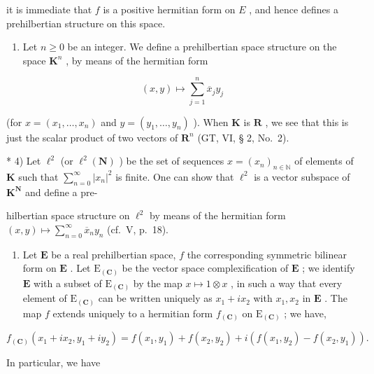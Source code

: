 it is immediate that \(f\) is a positive hermitian form on \(E\) , and hence defines a prehilbertian structure on this space.

\begin{enumerate}
\def\labelenumi{\arabic{enumi})}
\setcounter{enumi}{2}
\tightlist
\item
  Let \(n \geqslant 0\) be an integer. We define a prehilbertian space structure on the space \(\mathbf{K}^n\) , by means of the hermitian form
\end{enumerate}

\[
(x, y) \mapsto \sum_ {j = 1} ^ {n} \overline {{{{x}}}} _ {j} y _ {j}
\]

(for \(x = (x_{1}, \ldots, x_{n})\) and \(y = (y_{1}, \ldots, y_{n})\) ). When \(\mathbf{K}\) is \(\mathbf{R}\) , we see that this is just the scalar product of two vectors of \(\mathbf{R}^{n}\) (GT, VI, § 2, No.~2).

* 4) Let \(\ell^2\) (or \(\ell^2(\mathbf{N})\) ) be the set of sequences \(x = (x_n)_{n \in \mathbb{N}}\) of elements of \(\mathbf{K}\) such that \(\sum_{n=0}^{\infty} |x_n|^2\) is finite. One can show that \(\ell^2\) is a vector subspace of \(\mathbf{K}^{\mathbf{N}}\) and define a pre-

hilbertian space structure on \(\ell^2\) by means of the hermitian form \((x, y) \mapsto \sum_{n=0}^{\infty} \overline{x}_n y_n\) (cf.~V, p.~18).

\begin{enumerate}
\def\labelenumi{\arabic{enumi})}
\setcounter{enumi}{4}
\tightlist
\item
  Let \(\mathbf{E}\) be a real prehilbertian space, \(f\) the corresponding symmetric bilinear form on \(\mathbf{E}\) . Let \(\mathrm{E}_{(\mathbf{C})}\) be the vector space complexification of \(\mathbf{E}\) ; we identify \(\mathbf{E}\) with a subset of \(\mathrm{E}_{(\mathbf{C})}\) by the map \(x \mapsto 1 \otimes x\) , in such a way that every element of \(\mathrm{E}_{(\mathbf{C})}\) can be written uniquely as \(x_1 + ix_2\) with \(x_1, x_2\) in \(\mathbf{E}\) . The map \(f\) extends uniquely to a hermitian form \(f_{(\mathbf{C})}\) on \(\mathrm{E}_{(\mathbf{C})}\) ; we have,
\end{enumerate}

\[
f _ {(\mathbf {C})} \left(x _ {1} + i x _ {2}, y _ {1} + i y _ {2}\right) = f \left(x _ {1}, y _ {1}\right) + f \left(x _ {2}, y _ {2}\right) + i \left(f \left(x _ {1}, y _ {2}\right) - f \left(x _ {2}, y _ {1}\right)\right).
\]

In particular, we have

